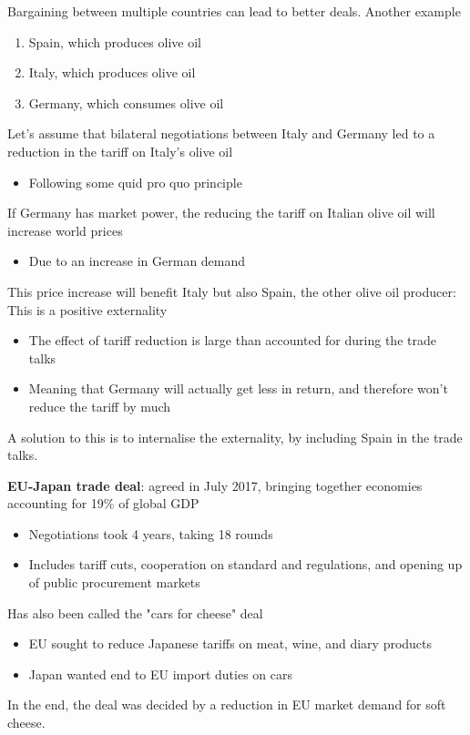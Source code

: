 \documentclass{beamer}
\begin{document}
\begin{frame}
    Bargaining between multiple countries can lead to better deals.
    Another example 
    \begin{enumerate}
      \item Spain, which produces olive oil
      \item Italy, which produces olive oil
      \item Germany, which consumes olive oil
    \end{enumerate}
    \medskip
    Let's assume that bilateral negotiations between Italy and Germany led to a reduction in the tariff on Italy's olive oil
    \begin{itemize}
      \item Following some quid pro quo principle
    \end{itemize}
\end{frame}

\begin{frame}
  If Germany has market power, the reducing the tariff on Italian olive oil will increase world prices
  \begin{itemize}
    \item Due to an increase in German demand
  \end{itemize}
  \medskip
  This price increase will benefit Italy but also Spain, the other olive oil producer: This is a positive externality
  \begin{itemize}
    \item The effect of tariff reduction is large than accounted for during the trade talks
    \item Meaning that Germany will actually get less in return, and therefore won't reduce the tariff by much
  \end{itemize}
  \medskip
  A solution to this is to internalise the externality, by including Spain in the trade talks. 
\end{frame}

\begin{frame}
  \textbf{EU-Japan trade deal}: agreed in July 2017, bringing together economies accounting for 19\% of global GDP
  \begin{itemize}
    \item Negotiations took 4 years, taking 18 rounds
    \item Includes tariff cuts, cooperation on standard and regulations, and opening up of public procurement markets
  \end{itemize}
  \medskip
  Has also been called the "cars for cheese" deal
  \begin{itemize}
    \item EU sought to reduce Japanese tariffs on meat, wine, and diary products
    \item Japan wanted end to EU import duties on cars
  \end{itemize}
  \medskip
  In the end, the deal was decided by a reduction in EU market demand for soft cheese.
\end{frame}
\end{document}
